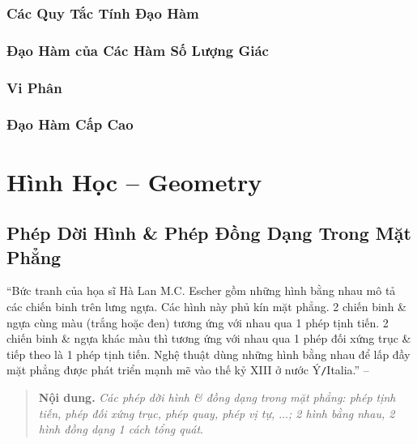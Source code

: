 \documentclass[oneside]{book}
\numberwithin{equation}{section}
\begin{document}

\section{Các Quy Tắc Tính Đạo Hàm}


\section{Đạo Hàm của Các Hàm Số Lượng Giác}


\section{Vi Phân}


\section{Đạo Hàm Cấp Cao}


\part{Hình Học -- Geometry}

\chapter{Phép Dời Hình \& Phép Đồng Dạng Trong Mặt Phẳng}

``Bức tranh của họa sĩ Hà Lan M.C. Escher gồm những hình bằng nhau mô tả các chiến binh trên lưng ngựa. Các hình này phủ kín mặt phẳng. 2 chiến binh \& ngựa cùng màu (trắng hoặc đen) tương ứng với nhau qua 1 phép tịnh tiến. 2 chiến binh \& ngựa khác màu thì tương ứng với nhau qua 1 phép đối xứng trục \& tiếp theo là 1 phép tịnh tiến. Nghệ thuật dùng những hình bằng nhau để lấp đầy mặt phẳng được phát triển mạnh mẽ vào thế kỷ XIII ở nước Ý\texttt{/}Italia.'' -- \cite[p. 3]{SGK_Toan_11_hinh_hoc_nang_cao}

\begin{quotation}
	\textbf{Nội dung.} \textit{Các phép dời hình \& đồng dạng trong mặt phẳng: phép tịnh tiến, phép đối xứng trục, phép quay, phép vị tự, $\ldots$; 2 hình bằng nhau, 2 hình đồng dạng 1 cách tổng quát}.
\end{quotation}
\end{document}
